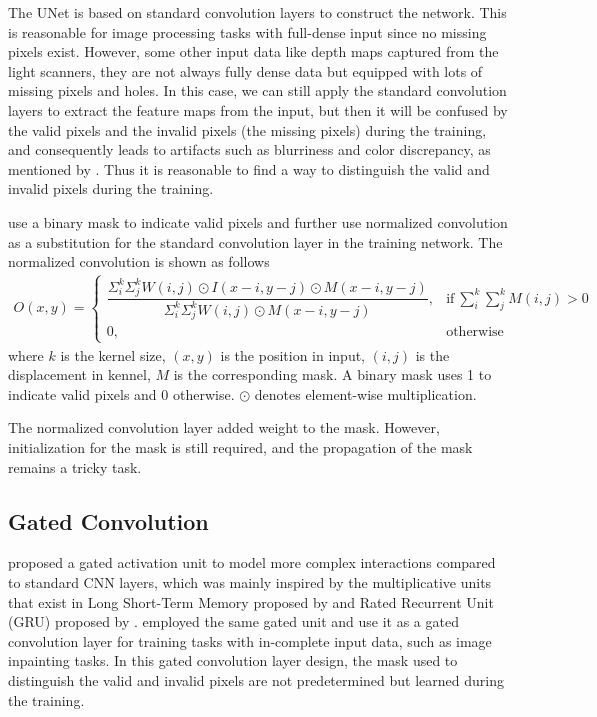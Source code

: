 The UNet is based on standard convolution layers to construct the network. This is reasonable for image processing tasks with full-dense input since no missing pixels exist. 
However, some other input data like depth maps captured from the light scanners, they are not always fully dense data but equipped with lots of missing pixels and holes. In this case, we can still apply the standard convolution layers to extract the feature maps from the input, but then it will be confused by the valid pixels and the invalid pixels (the missing pixels) during the training, and consequently leads to artifacts such as blurriness and color discrepancy, as mentioned by \cite{partial_conv}. Thus it is reasonable to find a way to distinguish the valid and invalid pixels during the training. 


\cite{pncnn0} use a binary mask to indicate valid pixels and further use normalized convolution as a substitution for the standard convolution layer in the training network. The normalized convolution is shown as follows
\begin{equation}
	\begin{array}{rrclcl}
		O(x,y) = 
		\begin{cases}
			\dfrac{\Sigma_i^k\Sigma_j^k W(i,j) \odot I(x-i,y-j) \odot M(x-i,y-j)}{\Sigma_i^k\Sigma_j^k W(i,j) \odot M(x-i,y-j)}, & \text{if}\ \sum_{i}^k\sum_{j}^k M(i,j)>0 \\
			0, & \text{otherwise}
		\end{cases}
	\end{array}
\end{equation}
where $ k $ is the kernel size, $ (x,y) $ is the position in input, $ (i,j) $ is the displacement in kennel, $ M $ is the corresponding mask. A binary mask uses 1 to indicate valid pixels and 0 otherwise. $ \odot $ denotes element-wise multiplication.

The normalized convolution layer added weight to the mask. However, initialization for the mask is still required, and the propagation of the mask remains a tricky task. 
\subsection{Gated Convolution}

\cite{gated_activation} proposed a gated activation unit to model more complex interactions compared to standard CNN layers, which was mainly inspired by the multiplicative units that exist in Long Short-Term Memory proposed by \cite{lstm} and Rated Recurrent Unit (GRU) proposed by \cite{gru}. \cite{gconv} employed the same gated unit and use it as a gated convolution layer for training tasks with in-complete input data, such as image inpainting tasks. In this gated convolution layer design, the mask used to distinguish the valid and invalid pixels are not predetermined but learned during the training. 

